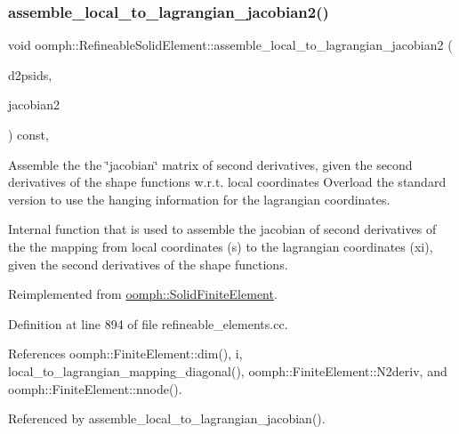 \subsubsection{\texorpdfstring{assemble\+\_\+local\+\_\+to\+\_\+lagrangian\+\_\+jacobian2()}{assemble\_local\_to\_lagrangian\_jacobian2()}}
{\footnotesize\ttfamily void oomph\+::\+Refineable\+Solid\+Element\+::assemble\+\_\+local\+\_\+to\+\_\+lagrangian\+\_\+jacobian2 (\begin{DoxyParamCaption}\item[{const \hyperlink{classoomph_1_1DShape}{D\+Shape} \&}]{d2psids,  }\item[{\hyperlink{classoomph_1_1DenseMatrix}{Dense\+Matrix}$<$ double $>$ \&}]{jacobian2 }\end{DoxyParamCaption}) const\hspace{0.3cm}{\ttfamily [protected]}, {\ttfamily [virtual]}}



Assemble the the \char`\"{}jacobian\char`\"{} matrix of second derivatives, given the second derivatives of the shape functions w.\+r.\+t. local coordinates Overload the standard version to use the hanging information for the lagrangian coordinates. 

Internal function that is used to assemble the jacobian of second derivatives of the the mapping from local coordinates (s) to the lagrangian coordinates (xi), given the second derivatives of the shape functions. 

Reimplemented from \hyperlink{classoomph_1_1SolidFiniteElement_a33ab1427cebdc36ff77d897f5db9f3a6}{oomph\+::\+Solid\+Finite\+Element}.



Definition at line 894 of file refineable\+\_\+elements.\+cc.



References oomph\+::\+Finite\+Element\+::dim(), i, local\+\_\+to\+\_\+lagrangian\+\_\+mapping\+\_\+diagonal(), oomph\+::\+Finite\+Element\+::\+N2deriv, and oomph\+::\+Finite\+Element\+::nnode().



Referenced by assemble\+\_\+local\+\_\+to\+\_\+lagrangian\+\_\+jacobian().

\mbox{\label{classoomph_1_1RefineableSolidElement_a973020f4458c30aa458468b7f757ba7c}} 

